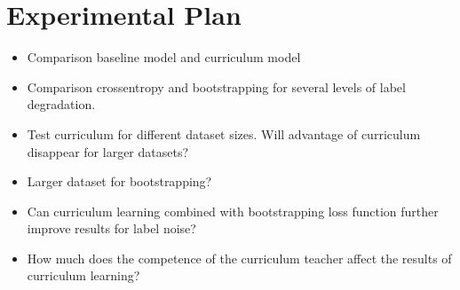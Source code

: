 \section{Experimental Plan}
\label{sec:experimentalPlan}
\begin{itemize}
\item Comparison baseline model and curriculum model
\item Comparison crossentropy and bootstrapping for several
levels of label degradation. 
\item Test curriculum for different dataset sizes. Will advantage of curriculum disappear for larger datasets?
\item Larger dataset for bootstrapping?
\item Can curriculum learning combined with bootstrapping loss function further improve results for label noise?
\item How much does the competence of the curriculum teacher affect the results of curriculum learning?
\end{itemize}